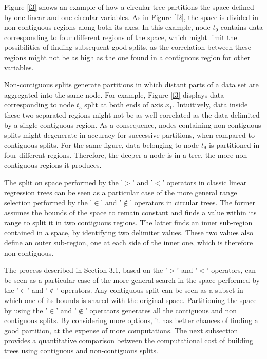 \documentclass[times,twocolumn,final,authoryear]{elsarticle}
\begin{document}
Figure \ref{f3} shows an example of how a circular tree partitions the space defined by one linear and one circular variables. As in Figure \ref{f2}, the space is divided in non-contiguous regions along both its axes. In this example, node $t_9$ contains data corresponding to four different regions of the space, which might limit the possibilities of finding subsequent good splits, as the correlation between these regions might not be as high as the one found in a contiguous region for other variables. 

Non-contiguous splits generate partitions in which distant parts of a data set are aggregated into the same node. For example, Figure \ref{f3} displays data corresponding to node $t_5$ split at both ends of axis $x_1$. Intuitively, data inside these two separated regions might not be as well correlated as the data delimited by a single contiguous region. As a consequence, nodes containing non-contiguous splits might degenerate in accuracy for successive partitions, when compared to contiguous splits. For the same figure, data belonging to node $t_9$ is partitioned in four different regions. Therefore, the deeper a node is in a tree, the more non-contiguous regions it produces.

The split on space performed by the '$>$' and '$<$' operators in classic linear regression trees can be seen as a particular case of the more general range selection performed by the '$\in$' and '$\notin$' operators in circular trees. The former assumes the bounds of the space to remain constant and finds a value within its range to split it in two contiguous regions. The latter finds an inner sub-region contained in a space, by identifying two delimiter values. These two values also define an outer sub-region, one at each side of the inner one, which is therefore non-contiguous.

The process described in Section 3.1, based on the '$>$' and '$<$' operators, can be seen as a particular case of the more general search in the space performed by the '$\in$' and '$\notin$' operators. Any contiguous split can be seen as a subset in which one of its bounds is shared with the original space. Partitioning the space by using the '$\in$' and '$\notin$' operators generates all the contiguous and non contiguous splits. By considering more options, it has better chances of finding a good partition, at the expense of more computations. The next subsection provides a quantitative comparison between the computational cost of building trees using contiguous and non-contiguous splits.
\end{document}
